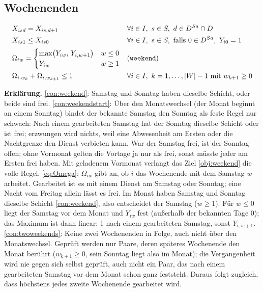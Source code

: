 \documentclass[11pt]{combiArticle}
\newcommand{\code}[1]{\texttt{#1}}
\begin{document}
\subsection{Wochenenden}

\begin{align}
  & X_{isd} = X_{is,d+1} && \forall i \in I,\ s \in S,\ d \in D^{Sa} \cap D \label{con:weekend}\\
  & X_{is1} \le X_{is0} && \forall i \in I,\ s \in S, \text{ falls } 0 \in D^{Sa},\ Y_{i0} = 1 \label{con:weekendstart}\\
  & \Omega_{iw} = \begin{cases}
      \max\bigl(Y_{iw},\, Y_{i,w+1}\bigr) & w \le 0\\
      Y_{iw} & w \ge 1
    \end{cases} && \text{(\code{weekend})} \label{eq:Omega}\\
  & \Omega_{i,w_k} + \Omega_{i,w_{k+1}} \le 1 && \forall i \in I,\ k = 1,\dots,|W|-1 \text{ mit } w_{k+1} \ge 0
    \label{con:twoweekends}
\end{align}

\textbf{Erklärung.}
\eqref{con:weekend}: Samstag und Sonntag haben dieselbe Schicht, oder beide sind frei.
\eqref{con:weekendstart}: Über den Monatswechsel (der Monat beginnt an einem Sonntag) bindet der bekannte Samstag
den Sonntag als feste Regel nur schwach: Nach einem gearbeiteten Samstag hat der Sonntag dieselbe Schicht oder ist
frei; erzwungen wird nichts, weil eine Abwesenheit am Ersten oder die Nachtgrenze den Dienst verbieten kann. War
der Samstag frei, ist der Sonntag offen; ohne Vormonat gelten die Vortage ja nur als frei, sonst müsste jeder am
Ersten frei haben. Mit geladenem Vormonat verlangt das Ziel \eqref{obj:weekend} die volle Regel.
\eqref{eq:Omega}: $\Omega_{iw}$ gibt an, ob $i$ das Wochenende mit dem Samstag $w$ arbeitet. Gearbeitet ist es
mit einem Dienst am Samstag oder Sonntag; eine Nacht vom Freitag allein lässt es frei. Im Monat haben Samstag
und Sonntag dieselbe Schicht \eqref{con:weekend}, also entscheidet der Samstag ($w \ge 1$). Für $w \le 0$ liegt
der Samstag vor dem Monat und $Y_{iw}$ fest (außerhalb der bekannten Tage 0); das Maximum ist dann linear: 1 nach
einem gearbeiteten Samstag, sonst $Y_{i,w+1}$.
\eqref{con:twoweekends}: Keine zwei Wochenenden in Folge, auch nicht über den Monatswechsel. Geprüft werden nur
Paare, deren späteres Wochenende den Monat berührt ($w_{k+1} \ge 0$, sein Sonntag liegt also im Monat); die
Vergangenheit wird nie gegen sich selbst geprüft, auch nicht ein Paar, das nach einem gearbeiteten Samstag vor
dem Monat schon ganz feststeht. Daraus folgt zugleich, dass höchstens jedes zweite Wochenende gearbeitet wird.
\end{document}
